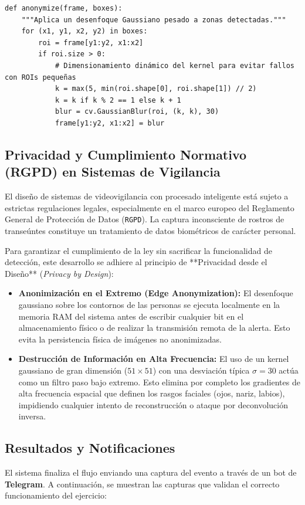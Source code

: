 \documentclass[12pt,a4paper]{article}
\begin{document}
\begin{verbatim}
def anonymize(frame, boxes):
    """Aplica un desenfoque Gaussiano pesado a zonas detectadas."""
    for (x1, y1, x2, y2) in boxes:
        roi = frame[y1:y2, x1:x2]
        if roi.size > 0:
            # Dimensionamiento dinámico del kernel para evitar fallos con ROIs pequeñas
            k = max(5, min(roi.shape[0], roi.shape[1]) // 2)
            k = k if k % 2 == 1 else k + 1
            blur = cv.GaussianBlur(roi, (k, k), 30)
            frame[y1:y2, x1:x2] = blur
\end{verbatim}

\subsection{Privacidad y Cumplimiento Normativo (RGPD) en Sistemas de Vigilancia}
El diseño de sistemas de videovigilancia con procesado inteligente está sujeto a estrictas regulaciones legales, especialmente en el marco europeo del Reglamento General de Protección de Datos (\texttt{RGPD}). La captura inconsciente de rostros de transeúntes constituye un tratamiento de datos biométricos de carácter personal.

Para garantizar el cumplimiento de la ley sin sacrificar la funcionalidad de detección, este desarrollo se adhiere al principio de **Privacidad desde el Diseño** (\textit{Privacy by Design}):
\begin{itemize}
    \item \textbf{Anonimización en el Extremo (Edge Anonymization):} El desenfoque gaussiano sobre los contornos de las personas se ejecuta localmente en la memoria RAM del sistema antes de escribir cualquier bit en el almacenamiento físico o de realizar la transmisión remota de la alerta. Esto evita la persistencia física de imágenes no anonimizadas.
    \item \textbf{Destrucción de Información en Alta Frecuencia:} El uso de un kernel gaussiano de gran dimensión ($51 \times 51$) con una desviación típica $\sigma = 30$ actúa como un filtro paso bajo extremo. Esto elimina por completo los gradientes de alta frecuencia espacial que definen los rasgos faciales (ojos, nariz, labios), impidiendo cualquier intento de reconstrucción o ataque por deconvolución inversa.
\end{itemize}

\subsection{Resultados y Notificaciones}
El sistema finaliza el flujo enviando una captura del evento a través de un bot de \textbf{Telegram}. A continuación, se muestran las capturas que validan el correcto funcionamiento del ejercicio:
\end{document}
